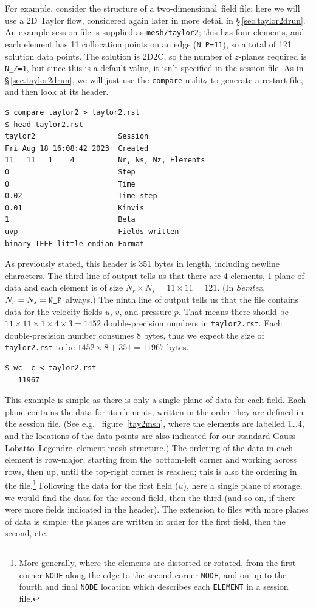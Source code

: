 \documentclass[11pt]{report}
\newcommand{\Semtex}{\emph{Semtex}} \newcommand{\Dog}{\emph{Dog}}
\newcommand\twod{two-di\-men\-sion\-al}
\newcommand{\eg}{e.g.\ } \newcommand{\CC}{\mathrm{c.c.}}
\newcommand\GLL{Gauss--Lobatto--Legendre}
\begin{document}
For example, consider the structure of a \twod\ field file; here we
will use a 2D Taylor flow, considered again later in more detail in
\S\,\ref{sec.taylor2drun}.  An example session file is supplied as
\verb|mesh/taylor2|; this has four elements, and each element has 11
collocation points on an edge (\verb|N_P=11|), so a total of 121
solution data points.  The solution is 2D2C, so the number of
$z$-planes required is \verb|N_Z=1|, but since this is a default
value, it isn't specified in the session file.  As in
\S\,\ref{sec.taylor2drun}, we will just use the \verb|compare| utility
to generate a restart file, and then look at its header. {\small
\begin{verbatim}
$ compare taylor2 > taylor2.rst
$ head taylor2.rst
taylor2                   Session
Fri Aug 18 16:08:42 2023  Created
11   11   1    4          Nr, Ns, Nz, Elements
0                         Step
0                         Time
0.02                      Time step
0.01                      Kinvis
1                         Beta
uvp                       Fields written
binary IEEE little-endian Format
\end{verbatim}
}

As previously stated, this header is 351 bytes in length, including
newline characters.  The third line of output tells us that there are
4 elements, 1 plane of data and each element is of size $N_r\times
N_s=11\times11=121$.  (In \Semtex, $N_r=N_s=\verb+N_P+$ always.)  The
ninth line of output tells us that the file contains data for the
velocity fields $u$, $v$, and pressure $p$.  That means there should
be $11\times11\times1\times4\times3=1452$ double-precision numbers in
\verb|taylor2.rst|.  Each double-precision number consumes 8 bytes,
thus we expect the size of \verb|taylor2.rst| to be
$1452\times8+351=11967$ bytes. {\small
\begin{verbatim}
$ wc -c < taylor2.rst
   11967
\end{verbatim}
}

This example is simple as there is only a single plane of data for
each field.  Each plane contains the data for its elements, written in
the order they are defined in the session file. (See \eg
figure~\ref{tay2msh}, where the elements are labelled 1\ldots4, and
the locations of the data points are also indicated for our standard
\GLL\ element mesh structure.)  The ordering of the data in each
element is row-major, starting from the bottom-left corner and working
across rows, then up, until the top-right corner is reached; this is
also the ordering in the file.\footnote{ More generally, where the
elements are distorted or rotated, from the first corner \texttt{NODE}
along the edge to the second corner \texttt{NODE}, and on up to the
fourth and final \texttt{NODE} location which describes each
\texttt{ELEMENT} in a session file.}  Following the data for the first
field ($u$), here a single plane of storage, we would find the data
for the second field, then the third (and so on, if there were more
fields indicated in the header).  The extension to files with more
planes of data is simple: the planes are written in order for the
first field, then the second, etc.
\end{document}
